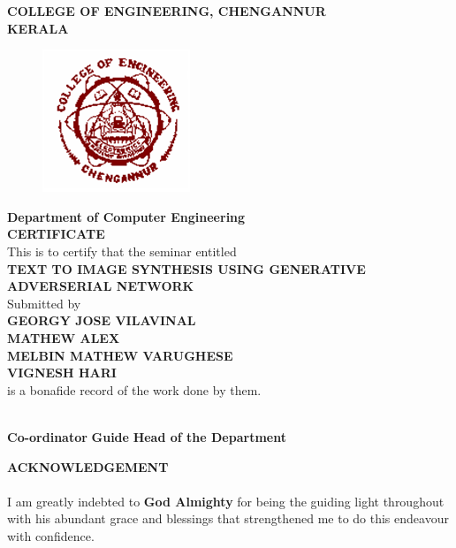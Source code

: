 \documentclass[a4paper,12pt,oneside]{article}
\begin{document}
\newpage
\thispagestyle{empty}
\begin{center}
\setlength{\baselineskip}{1.5\baselineskip}
{\large\textbf{COLLEGE OF ENGINEERING, CHENGANNUR}}
\\
{\large\textbf{KERALA}}
\\
\begin{figure}[H]
\centering
\includegraphics{ceclogo.png}
\end{figure}
\setlength{\baselineskip}{1.5\baselineskip}
\textbf{Department of Computer Engineering}
\\
\textbf{CERTIFICATE}
\\
This is to certify that the seminar entitled
\\
\textbf{TEXT TO IMAGE SYNTHESIS USING GENERATIVE ADVERSERIAL NETWORK}
\\
Submitted by
\\
\textbf{GEORGY JOSE VILAVINAL}
\\
\textbf{MATHEW ALEX}
\\
\textbf{MELBIN MATHEW VARUGHESE}
\\
\textbf{VIGNESH HARI}
\\
is a bonafide record of the work done by them.
\end{center}
\vspace{20ex}
\hspace{55ex}
\\

\hspace{0ex}
\textbf{Co-ordinator}
\hspace{18ex}
\textbf{Guide}
\hspace{18ex}
\textbf{Head of the Department}
\newpage
{}
\renewcommand{\headrulewidth}{0.0pt}
\renewcommand{\footrulewidth}{0.0pt}
\begin{center}
\large{\textbf{ACKNOWLEDGEMENT}}
\end{center}
\vspace{6ex}
\setlength{\baselineskip}{1.5\baselineskip}
\paragraph{}
I am greatly indebted to \textbf{God Almighty} for being the guiding light throughout with his
abundant grace and blessings that strengthened me to do this endeavour with confidence.
\end{document}
